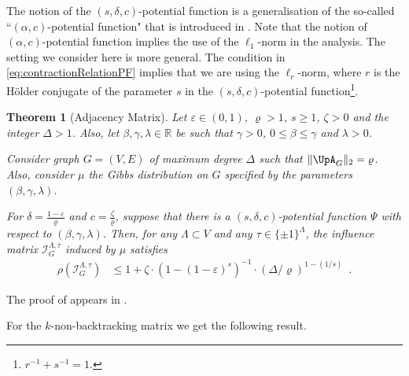 \documentclass[11pt,reqno]{amsart}
\numberwithin{equation}{section}
\newtheorem{theorem}{Theorem}[section]
\newcommand{\cI}{{\mathcal{I}}}
\newcommand{\applegreen}[1]{ {\color{applegreen}#1}}
\newcommand{\bluepigment}[1]{{\color{blue(pigment)}#1}}
\newcommand{\bostonuniversityred}[1]{{\color{bostonuniversityred}#1}}
\newcommand{\darkmagenta}[1]{{\color{darkmagenta}#1}}
\newcommand{\goldenbrown}[1]{{\color{goldenbrown}#1}}
\newcommand{\red}[1]{{\color{red}#1}}
\newcommand{\maxDeg}{{\Delta}}
\newcommand{\potF}{{\Psi}}
\newcommand{\pfs}{\darkmagenta{s}}
\newcommand{\infmatrix}{\cI}
\newcommand{\spradius}{{\rho}}
\newcommand{\norm}[2]{\goldenbrown{\|} #1 \goldenbrown{\|}_{#2}}
\newcommand{\Adjacency}{{\UpA}}
\newcommand{\aspradius}{{\varrho}}
\renewcommand{\applegreen}[1]{#1}
\renewcommand{\bluepigment}[1]{#1}
\renewcommand{\bostonuniversityred}[1]{#1}
\renewcommand{\darkmagenta}[1]{#1}
\renewcommand{\goldenbrown}[1]{#1}
\renewcommand{\red}[1]{#1}
\newcommand{\kk}{\bluepigment{k}}
\newcommand{\kell}{{\color{green(pigment)}\ell}}%
\newcommand{\kr}{\bostonuniversityred{r}}%
\renewcommand{\kk}{k}
\renewcommand{\kell}{\ell}
\renewcommand{\kr}{r}
\begin{document}
%
The notion of the $(\pfs,\delta, c)$-potential function  is a generalisation of the 
so-called ``$(\alpha,c)$-potential function" that is introduced in \cite{VigodaSpectralInd}. Note that 
the notion of $(\alpha,c)$-potential function implies the use of the $\kell_1$-norm in the analysis. 
The setting we consider here is more general. The condition in \eqref{eq:contractionRelationPF}
 implies that we are using the $\kell_{\kr}$-norm, where $\kr$ is the H\"older conjugate of the
parameter $\pfs$ in the $(\pfs,\delta, c)$-potential function\footnote{ $\kr^{-1}+\pfs^{-1}=1$. }. 



 
 \begin{theorem}[Adjacency Matrix]\label{thrm:AdjacencyPotentialSpIn}
 Let $\varepsilon\in (0,1)$, $\aspradius > 1$, $s\geq 1$, $\zeta>0$ and 
 the integer $\maxDeg > 1$.
% 
 Also, let $\beta,\gamma, \lambda\in \mathbb{R}$ be such that $\gamma >0$,
$0\leq \beta\leq \gamma$ and $\lambda>0$. 

Consider graph $G=(V,E)$ of maximum degree $\maxDeg$
such that $\norm{\Adjacency_G}{2}=\aspradius$. Also, consider $\mu$ the Gibbs
distribution on $G$ specified by the parameters $(\beta, \gamma, \lambda)$.


For $\delta= \frac{1-\varepsilon}{\aspradius}$ and $c=\frac{\zeta}{\aspradius}$, suppose that there
is a $(\pfs,\delta,c)$-potential function $\potF$ with respect to $(\beta,\gamma,\lambda)$. Then, for any
$\Lambda\subset V$ and any $\tau\in \{\pm 1\}^{\Lambda}$, the influence matrix
$\infmatrix^{\Lambda,\tau}_{G}$ induced by $\mu$ satisfies 
%
%
\begin{align}\label{eq:thrm:AdjacencyPotentialSpIn}
\spradius \left( \infmatrix^{\Lambda,\tau}_{G} \right) &\leq
1+ \zeta \cdot (1-(1-\varepsilon)^{\pfs})^{-1} \cdot (\maxDeg/\aspradius)^{1-(1/\pfs)} \enspace.
\end{align}
 \end{theorem}
The proof of  appears in .



For the $\kk$-non-backtracking matrix we get the following result.
\end{document}
